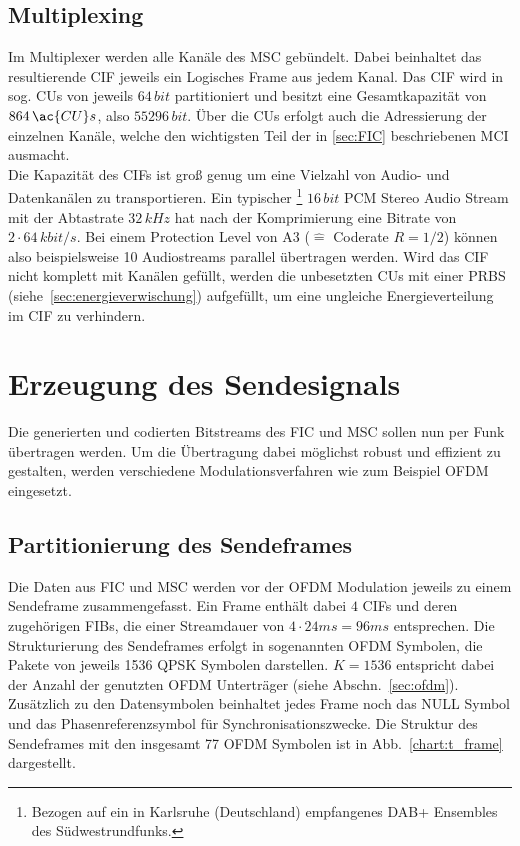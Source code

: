 \subsection{Multiplexing}
\label{sec:MUX}
Im Multiplexer werden alle Kanäle des MSC gebündelt. Dabei beinhaltet das resultierende \ac{CIF} jeweils ein Logisches Frame aus jedem Kanal. Das CIF wird in sog. \acp{CU} von jeweils $64 \, bit$ partitioniert und besitzt eine Gesamtkapazität von $864 \, \ac{CU}s$, also $55296 \, bit$. Über die \ac{CU}s erfolgt auch die Adressierung der einzelnen Kanäle, welche den wichtigsten Teil der in \ref{sec:FIC} beschriebenen \ac{MCI} ausmacht.\\
Die Kapazität des CIFs ist groß genug um eine Vielzahl von Audio- und Datenkanälen zu transportieren.  Ein typischer \footnote{Bezogen auf ein in Karlsruhe (Deutschland) empfangenes DAB+ Ensembles des Südwestrundfunks.} $16 \, bit$ PCM Stereo Audio Stream mit der Abtastrate $32\, kHz$ hat nach der Komprimierung eine Bitrate von $2\cdot64\, kbit/s$. Bei einem Protection Level von A3 ($\hat{=}$ Coderate $R=1/2$) können also beispielsweise 10 Audiostreams parallel übertragen werden.
Wird das CIF nicht komplett mit Kanälen gefüllt, werden die unbesetzten CUs mit einer \ac{PRBS} (siehe~\ref{sec:energieverwischung}) aufgefüllt, um eine ungleiche Energieverteilung im CIF zu verhindern.

\section{Erzeugung des Sendesignals}
\label{sec:ofdm_mod}
Die generierten und codierten Bitstreams des FIC und MSC sollen nun per Funk übertragen werden. Um die Übertragung dabei möglichst robust und effizient zu gestalten, werden verschiedene Modulationsverfahren wie zum Beispiel \ac{OFDM} eingesetzt.

\subsection{Partitionierung des Sendeframes}
\label{sec:transmission_frame}
Die Daten aus FIC und MSC werden vor der OFDM Modulation jeweils zu einem Sendeframe zusammengefasst. Ein Frame enthält dabei $4$ CIFs und deren zugehörigen FIBs, die einer Streamdauer von $4\cdot24ms = 96ms$ entsprechen. Die Strukturierung des Sendeframes erfolgt in sogenannten OFDM Symbolen, die Pakete von jeweils 1536 QPSK Symbolen darstellen. $K=1536$ entspricht dabei der Anzahl der genutzten OFDM Unterträger (siehe Abschn.~\ref{sec:ofdm}). Zusätzlich zu den Datensymbolen beinhaltet jedes Frame noch das NULL Symbol und das Phasenreferenzsymbol für Synchronisationszwecke. Die Struktur des Sendeframes mit den insgesamt 77 OFDM Symbolen ist in Abb.~\ref{chart:t_frame} dargestellt.

